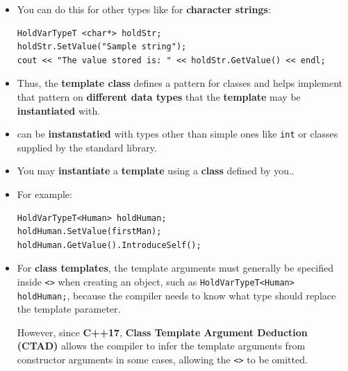 \documentclass[10pt]{article}
\newcommand{\pbreak}{\vspace{30pt}}
\begin{document}
\begin{itemize}
	\pbreak

\item You can do this for other types like for \textbf{character strings}:
	\begin{verbatim}
HoldVarTypeT <char*> holdStr;
holdStr.SetValue("Sample string");
cout << "The value stored is: " << holdStr.GetValue() << endl;
	\end{verbatim}

\item Thus, the \textbf{template class} defines a pattern for classes and helps implement that pattern on \textbf{different data types} that the \textbf{template} may be \textbf{instantiated} with.

\end{itemize}

\pbreak

\begin{tcolorbox}
	\begin{itemize}
		\item \textbf{} can be \textbf{instanstatied} with types other than simple ones like \verb|int| or classes supplied by the standard library.

		\item You may \textbf{instantiate} a \textbf{template} using a \textbf{class} defined by you..

		\item For example:

			\begin{verbatim}
HoldVarTypeT<Human> holdHuman;
holdHuman.SetValue(firstMan);
holdHuman.GetValue().IntroduceSelf();
			\end{verbatim}

			\item For \textbf{class templates}, the template arguments must generally be specified inside \verb|<>| when creating an object, such as \verb|HoldVarTypeT<Human> holdHuman;|, because the compiler needs to know what type should replace the template parameter.

				However, since \textbf{C++17}, \textbf{Class Template Argument Deduction (CTAD)} allows the compiler to infer the template arguments from constructor arguments in some cases, allowing the \verb|<>| to be omitted.
	\end{itemize}
\end{tcolorbox}

\newpage
\end{document}
